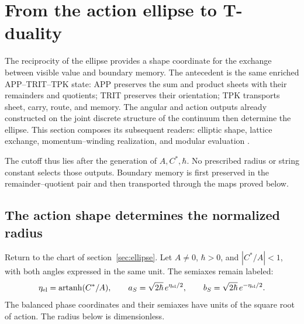 
\section{From the action ellipse to T-duality}
\label{sec:ii-dualidad-t}

The reciprocity of the ellipse provides a shape coordinate for the
exchange between visible value and boundary memory. The antecedent is the
same enriched APP--TRIT--TPK state: APP preserves the sum
and product sheets with their remainders and quotients; TRIT preserves their orientation;
TPK transports sheet, carry, route, and memory. The angular and
action outputs already constructed on the joint discrete structure of the continuum
then determine the ellipse. This section composes its subsequent readers:
elliptic shape, lattice exchange, momentum--winding realization,
and modular evaluation \cite{elipse,hmtedicionintegral}.

The cutoff thus lies after the generation of
\(A,C^*,\hbar\). No prescribed radius or string constant selects
those outputs. Boundary memory is first preserved in the
remainder--quotient pair and then transported through the maps proved
below.

\subsection{The action shape determines the normalized radius}

Return to the chart of section~\ref{sec:ellipse}. Let \(A\ne0\),
\(\hbar>0\), and \(|C^*/A|<1\), with both angles expressed in the same
unit. The semiaxes remain labeled:
\begin{equation}
 \eta_{\rm el}=\operatorname{artanh}(C^*/A),\qquad
 a_S=\sqrt{2\hbar}\,e^{\eta_{\rm el}/2},\qquad
 b_S=\sqrt{2\hbar}\,e^{-\eta_{\rm el}/2}.
 \label{eq:ii-t-elipse}
\end{equation}
The balanced phase coordinates and their semiaxes have units of the square root
of action. The radius below is dimensionless.

